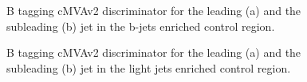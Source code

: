 \begin{figure}[!h]
\centering
{}
\caption{B tagging cMVAv2 discriminator for the leading (a) and the subleading (b)
jet in the b-jets enriched control region.\label{fig:bpogSF}}
\end{figure}
\begin{figure}[!h]
\centering
{}
\caption{B tagging cMVAv2 discriminator for the leading (a) and the subleading (b)
jet in the light jets enriched control region.\label{fig:bpogSF_Z}}
\end{figure}
